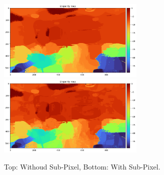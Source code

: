 \begin{figure}[h]
    \centering
    \includegraphics[width=7cm]{../result/disparity_map_nocorrection.png}
    \includegraphics[width=7cm]{../result/disparity_map_correction.png}
    \caption{Top: Withoud Sub-Pixel, Bottom: With Sub-Pixel.}
    \label{fig:result4}
    
\end{figure}
